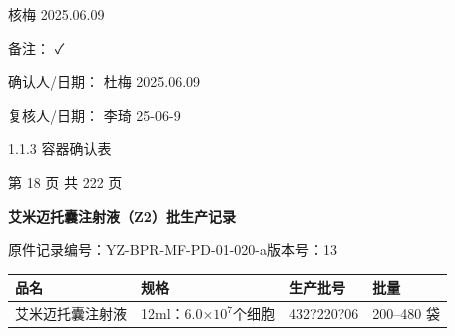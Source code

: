 \documentclass[UTF8,10pt,a4paper,fontset=fandol]{ctexart}
\newcommand{\fieldvalue}[1]{#1}
\newcommand{\handwritten}[1]{#1}
\begin{document}
\handwritten{核梅 2025.06.09}

备注：
\handwritten{✓}

确认人/日期：
\fieldvalue{\handwritten{杜梅}}
\quad
\fieldvalue{\handwritten{2025.06.09}}

\hfill
复核人/日期：
\fieldvalue{\handwritten{李琦}}
\quad
\fieldvalue{\handwritten{25-06-9}}

\vspace{0.5em}

1.1.3 容器确认表


\begin{center}
第 18 页 共 222 页
\end{center}

\newpage

\begin{center}
\textbf{艾米迈托囊注射液（Z2）批生产记录}
\end{center}

\noindent
原件\hfill 记录编号：YZ-BPR-MF-PD-01-020-a\hfill 版本号：13

\begin{tabularx}{\textwidth}{|X|X|X|X|}
\hline
品名 & 规格 & 生产批号 & 批量\\
\hline
艾米迈托囊注射液 & 12ml：6.0$\times 10^7$个细胞 &
\fieldvalue{\handwritten{432?220?06}} & 200--480 袋\\
\hline
\end{tabularx}
\end{document}
